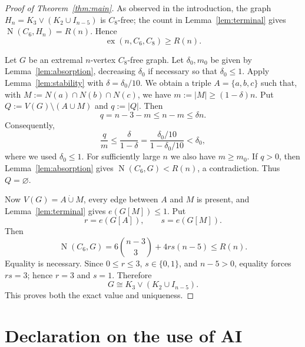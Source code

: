 \documentclass[11pt,letterpaper]{article}
\newcommand{\ex}{\operatorname{ex}}
\newcommand{\N}{\operatorname{N}}
\begin{document}
\begin{proof}[Proof of Theorem~\ref{thm:main}]
As observed in the introduction, the graph
$
  H_n=K_3\vee(K_2\cup I_{n-5})
$ 
is \(C_8\)-free; the count in Lemma~\ref{lem:terminal} gives \(\N(C_6,H_n)=R(n)\). Hence
\[
  \ex(n,C_6,C_8)\ge R(n).
\]

Let \(G\) be an extremal \(n\)-vertex \(C_8\)-free graph. Let \(\delta_0,m_0\) be given by
Lemma~\ref{lem:absorption}, decreasing \(\delta_0\) if necessary so that \(\delta_0\le1\). Apply
Lemma~\ref{lem:stability} with $\delta=\delta_0/10.$ 
We obtain a triple \(A=\{a,b,c\}\) such that, with \(M:=N(a)\cap N(b)\cap N(c)\), we have \(m:=|M|\ge(1-\delta)n\). Put \(Q:=V(G)\setminus(A\cup M)\) and \(q:=|Q|\). Then
\[
  q=n-3-m\le n-m\le\delta n.
\]
Consequently,
\[
  \frac qm\le\frac{\delta}{1-\delta}
  =\frac{\delta_0/10}{1-\delta_0/10}<\delta_0,
\]
where we used \(\delta_0\le1\). For sufficiently large \(n\) we also have \(m\ge m_0\). If \(q>0\),
then Lemma~\ref{lem:absorption} gives \(\N(C_6,G)<R(n)\), a contradiction. Thus
\(Q=\varnothing\).

Now \(V(G)=A\mathbin{\dot\cup}M\), every edge between \(A\) and \(M\) is present, and
Lemma~\ref{lem:terminal} gives \(e(G[M])\le1\). Put
\[
  r=e(G[A]),
  \qquad
  s=e(G[M]).
\]
Then
\[
  \N(C_6,G)=6\binom{n-3}{3}+4rs(n-5)\le R(n).
\]
Equality is necessary. Since \(0\le r\le3\), \(s\in\{0,1\}\), and \(n-5>0\), equality forces
\(rs=3\); hence \(r=3\) and \(s=1\). Therefore
\[
  G\cong K_3\vee(K_2\cup I_{n-5}).
\]
This proves both the exact value and uniqueness.
\end{proof}

\section*{Declaration on the use of AI}
\end{document}
